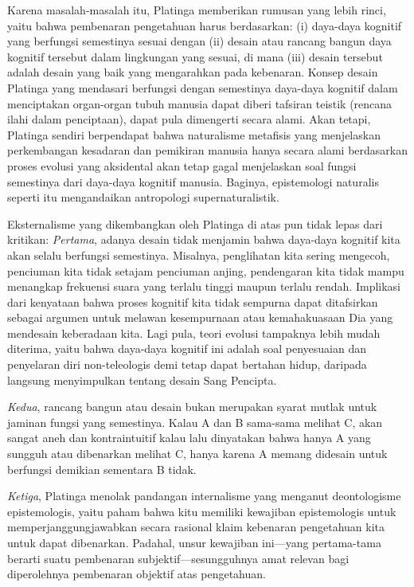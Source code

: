 \documentclass[10pt,a4paper]{article}
\begin{document}
\begin{multicols}{2}
Karena masalah-masalah itu, Platinga memberikan rumusan yang lebih
rinci, yaitu bahwa pembenaran pengetahuan harus berdasarkan: (i)
daya-daya kognitif yang berfungsi semestinya sesuai dengan (ii) desain
atau rancang bangun daya kognitif tersebut dalam lingkungan yang sesuai,
di mana (iii) desain tersebut adalah desain yang baik yang mengarahkan
pada kebenaran. Konsep desain Platinga yang mendasari berfungsi dengan
semestinya daya-daya kognitif dalam menciptakan organ-organ tubuh
manusia dapat diberi tafsiran teistik (rencana ilahi dalam penciptaan),
dapat pula dimengerti secara alami. Akan tetapi, Platinga sendiri
berpendapat bahwa naturalisme metafisis yang menjelaskan perkembangan
kesadaran dan pemikiran manusia hanya secara alami berdasarkan proses
evolusi yang aksidental akan tetap gagal menjelaskan soal fungsi
semestinya dari daya-daya kognitif manusia. Baginya, epistemologi
naturalis seperti itu mengandaikan antropologi supernaturalistik.

Eksternalisme yang dikembangkan oleh Platinga di atas pun tidak lepas
dari kritikan: \emph{Pertama}, adanya desain tidak menjamin bahwa
daya-daya kognitif kita akan selalu berfungsi semestinya. Misalnya,
penglihatan kita sering mengecoh, penciuman kita tidak setajam penciuman
anjing, pendengaran kita tidak mampu menangkap frekuensi suara yang
terlalu tinggi maupun terlalu rendah. Implikasi dari kenyataan bahwa
proses kognitif kita tidak sempurna dapat ditafsirkan sebagai argumen
untuk melawan kesempurnaan atau kemahakuasaan Dia yang mendesain
keberadaan kita. Lagi pula, teori evolusi tampaknya lebih mudah
diterima, yaitu bahwa daya-daya kognitif ini adalah soal penyesuaian dan
penyelaran diri non-teleologis demi tetap dapat bertahan hidup, daripada
langsung menyimpulkan tentang desain Sang Pencipta.

\emph{Kedua}, rancang bangun atau desain bukan merupakan syarat mutlak
untuk jaminan fungsi yang semestinya. Kalau A dan B sama-sama melihat C,
akan sangat aneh dan kontraintuitif kalau lalu dinyatakan bahwa hanya A
yang sungguh atau dibenarkan melihat C, hanya karena A memang didesain
untuk berfungsi demikian sementara B tidak.

\emph{Ketiga}, Platinga menolak pandangan internalisme yang menganut
deontologisme epistemologis, yaitu paham bahwa kitu memiliki kewajiban
epistemologis untuk memperjanggungjawabkan secara rasional klaim
kebenaran pengetahuan kita untuk dapat dibenarkan. Padahal, unsur
kewajiban ini---yang pertama-tama berarti suatu pembenaran
subjektif---sesungguhnya amat relevan bagi diperolehnya pembenaran
objektif atas pengetahuan.


\end{multicols}
\end{document}
